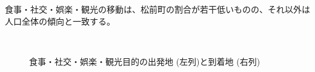 \documentclass[a4paper,12pt, uplatex]{jsbook}
\begin{document}
食事・社交・娯楽・観光の移動は、松前町の割合が若干低いものの、それ以外は人口全体の傾向と一致する。
%
\begin{figure}[htbp]
  \centering
  \\%
    \caption{食事・社交・娯楽・観光目的の出発地 (左列)と到着地 (右列)}
  	\label{fig:od_leisure_care}
\end{figure}
\end{document}

